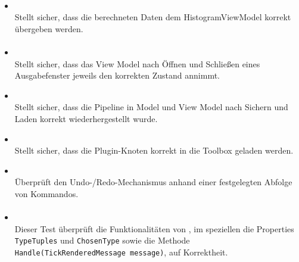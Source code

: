 \paragraph{}
\begin{itemize}
	\item{} \\
		Stellt sicher, dass die berechneten Daten dem HistogramViewModel korrekt übergeben werden.
\end{itemize}

\paragraph{}
\begin{itemize}
	\item {} \\
	Stellt sicher, dass das View Model nach Öffnen und Schließen eines Ausgabefenster jeweils den korrekten Zustand annimmt.
	\item {} \\
	Stellt sicher, dass die Pipeline in Model und View Model nach Sichern und Laden korrekt wiederhergestellt wurde.
	\item {} \\
	Stellt sicher, dass die Plugin-Knoten korrekt in die Toolbox geladen werden.
	\item {} \\
	Überprüft den Undo-/Redo-Mechanismus anhand einer festgelegten Abfolge von Kommandos.
\end{itemize}

\paragraph{}

\begin{itemize}

\item{}~\\
Dieser Test überprüft die Funktionalitäten von , im speziellen die Properties \verb#TypeTuples# und \verb#ChosenType# sowie die Methode \verb#Handle(TickRenderedMessage message)#, auf Korrektheit.

\end{itemize}

